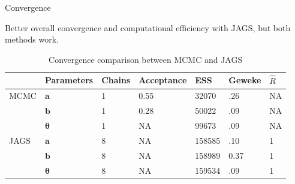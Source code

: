 \documentclass[xcolor=dvipsnames]{beamer}
\begin{document}

\begin{frame}{Convergence}

Better overall convergence and computational efficiency with JAGS, but both methods work.

\begin{table}[]
    \centering
    \begin{tabular}{lllllll}
    \toprule[1.5pt]
         & Parameters & Chains & Acceptance & ESS & Geweke & $\hat{R}$ \\
         \midrule
        MCMC & $\boldsymbol{a}$ & 1 & 0.55 & 32070 & .26 & NA \\
        & $\boldsymbol{b}$ & 1 & 0.28 & 50022 & .09 & NA \\
        & $\boldsymbol{\theta}$ & 1 & NA & 99673 & .09 & NA \\
        JAGS & $\boldsymbol{a}$ & 8 & NA & 158585 & .10 & 1 \\
        & $\boldsymbol{b}$ & 8 & NA & 158989 & 0.37 & 1 \\
        & $\boldsymbol{\theta}$ & 8 & NA & 159534 & .09 & 1 \\
        \bottomrule[1.5pt]
    \end{tabular}
    \caption{Convergence comparison between MCMC and JAGS}
\end{table}

\end{frame}

\end{document}
